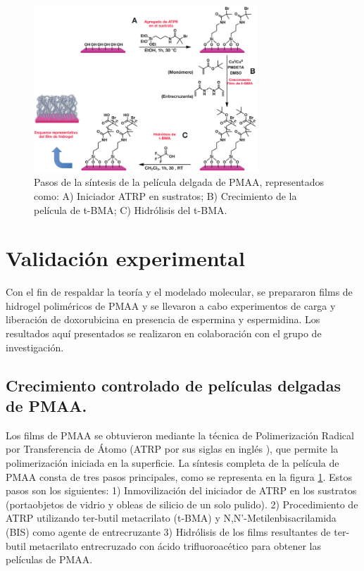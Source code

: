 

\begin{figure}[!htb]
	\centering
	\includegraphics[width=0.75\textwidth]{Figures/graph-film/exp_synt_scheme.pdf}
	\caption{Pasos de la s\'intesis de la pel\'icula delgada de PMAA, representados como: A) Iniciador ATRP en sustratos; B) Crecimiento de la pel\'icula de t-BMA; C) Hidr\'olisis del t-BMA.}
	\label{fig:film:synthesis_scheme}
\end{figure}




\section{Validaci\'on experimental}


Con el fin de respaldar la teor\'ia y el modelado molecular, se prepararon films de hidrogel polim\'ericos de PMAA y se llevaron a cabo experimentos de carga y liberaci\'on de doxorubicina en presencia de espermina y espermidina. %
Los resultados aqu\'i presentados se realizaron en colaboraci\'on con el grupo de investigaci\'on.



\subsection{Crecimiento controlado de pel\'iculas delgadas de PMAA.}

Los films  de PMAA se obtuvieron mediante la t\'ecnica de Polimerizaci\'on Radical por Transferencia de \'Atomo (ATRP por sus siglas en ingl\'es ), que permite la polimerizaci\'on iniciada en la superficie.
La s\'intesis completa de la pel\'icula de PMAA consta de tres pasos principales, como se representa en la figura \ref{fig:film:synthesis_scheme}. Estos pasos son los siguientes:
1) Inmovilizaci\'on del iniciador de ATRP en los sustratos (portaobjetos de vidrio y obleas de silicio de un solo pulido).
2) Procedimiento de ATRP utilizando ter-butil metacrilato (t-BMA) y N,N'-Metilenbisacrilamida (BIS) como agente de entrecruzante
3) Hidr\'olisis de los films resultantes de ter-butil metacrilato entrecruzado con \'acido trifluoroac\'etico para obtener las pel\'iculas de PMAA.


